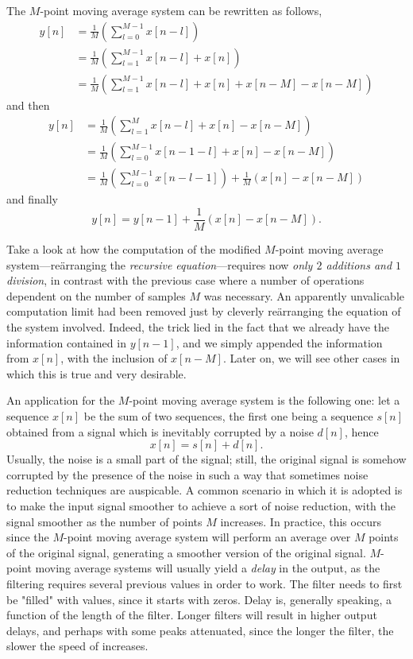 \documentclass[\documentfontsize, twocolumn]{\classname}
\begin{document}
The $M$-point moving average system can be rewritten as follows,
\begin{align*}
    y[n] &= \frac 1 M \left(\sum_{l=0}^{M-1}x[n-l]\right) \\
         &= \frac 1 M \left(\sum_{l=1}^{M-1}x[n-l] + x[n]\right)\\
         &= \frac 1 M \left(\sum_{l=1}^{M-1}x[n-l] + x[n] + x[n - M] - x[n - M]\right)
\end{align*}
and then
\begin{align*}
    y[n] &= \frac 1 M \left(\sum_{l=1}^{M}x[n-l] + x[n] - x[n - M]\right)\\
         &= \frac 1 M \left(\sum_{l=0}^{M-1}x[n-1-l] + x[n] - x[n - M]\right)\\
         &= \frac 1 M \left(\sum_{l=0}^{M-1}x[n-l-1]\right) + \frac 1 M \left(x[n] - x[n - M]\right)
\end{align*}
and finally
\[
    y[n] = y[n-1] + \frac 1 M \left(x[n] - x[n - M]\right).
\]

Take a look at how the computation of the modified $M$-point moving average system---re\"arranging the \emph{recursive e\-qua\-tion}---re\-qui\-res now \emph{only $2$ additions and $1$ division}, in contrast with the previous case where a number of operations dependent on the number of samples $M$ was necessary. An apparently unvalicable computation limit had been removed just by cleverly re\"arranging the equation of the system involved. Indeed, the trick lied in the fact that we already have the information contained in $y[n-1]$, and we simply appended the information from $x[n]$, with the inclusion of $x[n-M]$. Later on, we will see other cases in which this is true and very desirable.

An application for the $M$-point moving average system is the following one: let a sequence $x[n]$ be the sum of two sequences, the first one being a sequence $s[n]$ obtained from a signal which is inevitably corrupted by a noise $d[n]$, hence \[x[n] = s[n] + d[n].\] Usually, the noise is a small part of the signal; still, the original signal is somehow corrupted by the presence of the noise in such a way that sometimes noise reduction techniques are auspicable. A common scenario in which it is adopted is to make the input signal smoother to achieve a sort of noise reduction, with the signal smoother as the number of points $M$ increases. In practice, this occurs since the $M$-point moving average system will perform an average over $M$ points of the original signal, generating a smoother version of the original signal. $M$-point moving average systems will usually yield a \emph{delay} in the output, as the filtering requires several previous values in order to work. The filter needs to first be "filled" with values, since it starts with zeros. Delay is, generally speaking, a function of the length of the filter. Longer filters will result in higher output delays, and perhaps with some peaks attenuated, since the longer the filter, the slower the speed of increases.
\end{document}
